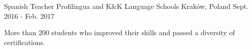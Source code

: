 \begin{cventries}
\cventry
    {Spanish Teacher} %
    {Profilingua and K\&K Language Schools} %
    {Kraków, Poland} %
    {Sept. 2016 - Feb. 2017} %
    {
        \begin{cvitems} %
            \item {More than 200 students who improved their skills and passed a diversity of certifications.}
        \end{cvitems}
    }

\end{cventries}
